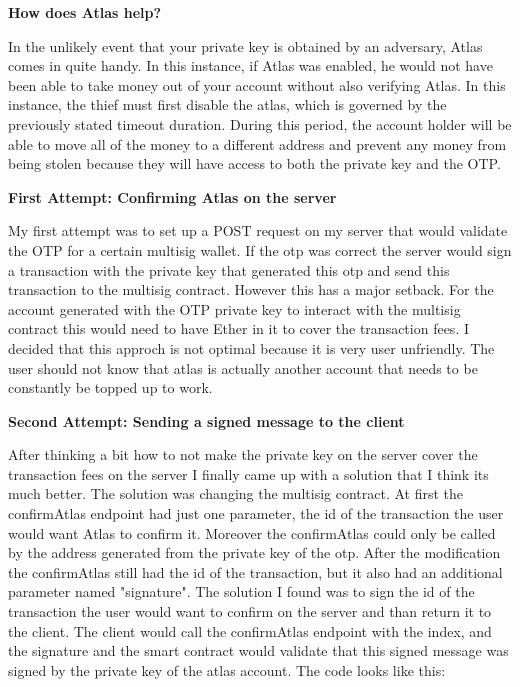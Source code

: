 \par \textbf{How does Atlas help?} 
\par In the unlikely event that your private key is obtained by an adversary, Atlas comes in quite handy. In this instance, if Atlas was enabled, he would not have been able to take money out of your account without also verifying Atlas. In this instance, the thief must first disable the atlas, which is governed by the previously stated timeout duration. During this period, the account holder will be able to move all of the money to a different address and prevent any money from being stolen because they will have access to both the private key and the OTP.
\par \textbf{First Attempt: Confirming Atlas on the server}
\par My first attempt was to set up a POST request on my server that would validate the OTP for a certain multisig wallet. If the otp was correct the server would sign a transaction with the private key that generated this otp and send this transaction to the multisig contract. However this has a major setback. For the account generated with the OTP private key to interact with the multisig contract this would need to have Ether in it to cover the transaction fees. I decided that this approch is not optimal because it is very user unfriendly. The user should not know that atlas is actually another account that needs to be constantly be topped up to work.
\par \textbf{Second Attempt: Sending a signed message to the client}
\par After thinking a bit how to not make the private key on the server cover the transaction fees on the server I finally came up with a solution that I think its much better. The solution was changing the multisig contract. At first the confirmAtlas endpoint had just one parameter, the id of the transaction the user would want Atlas to confirm it. Moreover the confirmAtlas could only be called by the address generated from the private key of the otp. After the modification the confirmAtlas still had the id of the transaction, but it also had an additional parameter named "signature". The solution I found was to sign the id of the transaction the user would want to confirm on the server and than return it to the client. The client would call the confirmAtlas endpoint with the index, and the signature and the smart contract would validate that this signed message was signed by the private key of the atlas account. The code looks like this:
\newline
